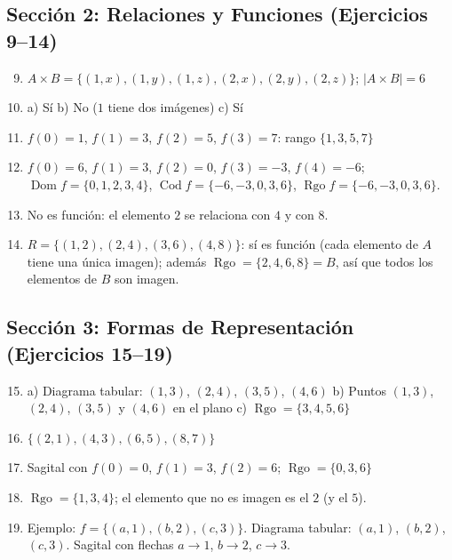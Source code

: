 \documentclass[12pt, letterpaper]{article}
\begin{document}
  \newpage

  \subsection*{Sección 2: Relaciones y Funciones (Ejercicios 9--14)}

  \begin{enumerate}[leftmargin=*, label=\textbf{\arabic*.}]
    \setcounter{enumi}{8}
    \item $A \times B = \{(1,x), (1,y), (1,z), (2,x), (2,y), (2,z)\}$; $|A \times B| = 6$

    \item a) Sí \quad b) No ($1$ tiene dos imágenes) \quad c) Sí

    \item $f(0)=1$, $f(1)=3$, $f(2)=5$, $f(3)=7$: rango $\{1, 3, 5, 7\}$

    \item $f(0)=6$, $f(1)=3$, $f(2)=0$, $f(3)=-3$, $f(4)=-6$; $\operatorname{Dom} f = \{0,1,2,3,4\}$, $\operatorname{Cod} f = \{-6,-3,0,3,6\}$, $\operatorname{Rgo} f = \{-6,-3,0,3,6\}$.

    \item No es función: el elemento $2$ se relaciona con $4$ y con $8$.

    \item $R = \{(1,2), (2,4), (3,6), (4,8)\}$: sí es función (cada elemento de $A$ tiene una única imagen); además $\operatorname{Rgo} = \{2,4,6,8\} = B$, así que todos los elementos de $B$ son imagen.
  \end{enumerate}

  \newpage

  \subsection*{Sección 3: Formas de Representación (Ejercicios 15--19)}

  \begin{enumerate}[leftmargin=*, label=\textbf{\arabic*.}]
    \setcounter{enumi}{14}
    \item a) Diagrama tabular: $(1,3)$, $(2,4)$, $(3,5)$, $(4,6)$ \quad b) Puntos $(1,3)$, $(2,4)$, $(3,5)$ y $(4,6)$ en el plano \quad c) $\operatorname{Rgo} = \{3,4,5,6\}$

    \item $\{(2,1), (4,3), (6,5), (8,7)\}$

    \item Sagital con $f(0)=0$, $f(1)=3$, $f(2)=6$; $\operatorname{Rgo} = \{0,3,6\}$

    \item $\operatorname{Rgo} = \{1,3,4\}$; el elemento que no es imagen es el $2$ (y el $5$).

    \item Ejemplo: $f = \{(a,1), (b,2), (c,3)\}$. Diagrama tabular: $(a,1)$, $(b,2)$, $(c,3)$. Sagital con flechas $a\to1$, $b\to2$, $c\to3$.
  \end{enumerate}
\end{document}
